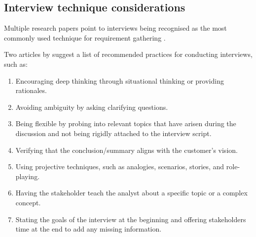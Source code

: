 \subsection{Interview technique considerations}

Multiple research papers point to interviews being recognised as the most commonly used technique for requirement gathering \parencite{interviews5,interviews1,interviews2}.  

Two articles by \textcite{interviews4, interviews3} suggest a list of recommended practices for conducting interviews, such as:
\begin{enumerate}
    \item Encouraging deep thinking through situational thinking or providing rationales.
    \item Avoiding ambiguity by asking clarifying questions.
    \item Being flexible by probing into relevant topics that have arisen during the discussion and not being rigidly attached to the interview script.
    \item Verifying that the conclusion/summary aligns with the customer's vision.
    \item Using projective techniques, such as analogies, scenarios, stories, and role-playing.
    \item Having the stakeholder teach the analyst about a specific topic or a complex concept.
    \item Stating the goals of the interview at the beginning and offering stakeholders time at the end to add any missing information.
\end{enumerate}

